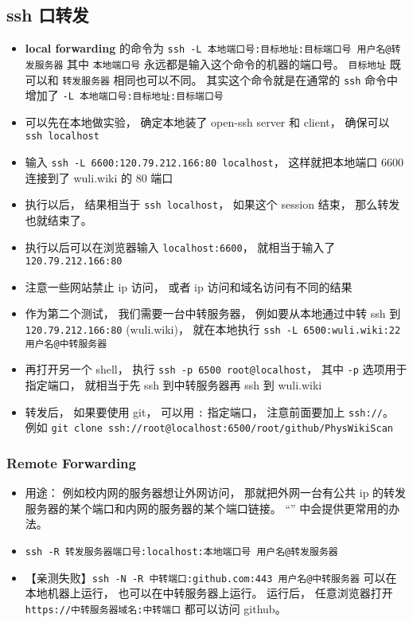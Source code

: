 \subsection{ssh 口转发}
\begin{itemize}
\item \textbf{local forwarding} 的命令为 \verb`ssh -L 本地端口号:目标地址:目标端口号 用户名@转发服务器` 其中 \verb`本地端口号` 永远都是输入这个命令的机器的端口号。 \verb`目标地址` 既可以和 \verb`转发服务器` 相同也可以不同。 其实这个命令就是在通常的 \verb`ssh` 命令中增加了 \verb`-L 本地端口号:目标地址:目标端口号`
\item 可以先在本地做实验， 确定本地装了 open-ssh server 和 client， 确保可以 \verb`ssh localhost`
\item 输入 \verb`ssh -L 6600:120.79.212.166:80 localhost`， 这样就把本地端口 6600 连接到了 wuli.wiki 的 80 端口
\item 执行以后， 结果相当于 \verb`ssh localhost`， 如果这个 session 结束， 那么转发也就结束了。
\item 执行以后可以在浏览器输入 \verb`localhost:6600`， 就相当于输入了 \verb`120.79.212.166:80`
\item 注意一些网站禁止 ip 访问， 或者 ip 访问和域名访问有不同的结果

\item 作为第二个测试， 我们需要一台中转服务器， 例如要从本地通过中转 ssh 到 \verb`120.79.212.166:80` (wuli.wiki)， 就在本地执行 \verb`ssh -L 6500:wuli.wiki:22 用户名@中转服务器`
\item 再打开另一个 shell， 执行 \verb`ssh -p 6500 root@localhost`， 其中 \verb`-p` 选项用于指定端口， 就相当于先 ssh 到中转服务器再 ssh 到 wuli.wiki

\item 转发后， 如果要使用 git， 可以用 \verb`:` 指定端口， 注意前面要加上 \verb`ssh://`。  例如 \verb`git clone ssh://root@localhost:6500/root/github/PhysWikiScan`
\end{itemize}

\subsubsection{Remote Forwarding}
\begin{itemize}
\item 用途： 例如校内网的服务器想让外网访问， 那就把外网一台有公共 ip 的转发服务器的某个端口和内网的服务器的某个端口链接。 “” 中会提供更常用的办法。
\item \verb`ssh -R 转发服务器端口号:localhost:本地端口号 用户名@转发服务器`
\item 【亲测失败】\verb`ssh -N -R 中转端口:github.com:443 用户名@中转服务器` 可以在本地机器上运行， 也可以在中转服务器上运行。 运行后， 任意浏览器打开 \verb`https://中转服务器域名:中转端口` 都可以访问 github。
\end{itemize}
